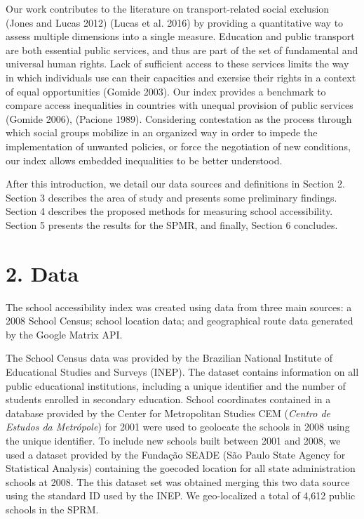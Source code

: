 \documentclass[]{article}
\begin{document}
Our work contributes to the literature on transport-related social
exclusion (Jones and Lucas 2012) (Lucas et al. 2016) by providing a
quantitative way to assess multiple dimensions into a single measure.
Education and public transport are both essential public services, and
thus are part of the set of fundamental and universal human rights. Lack
of sufficient access to these services limits the way in which
individuals use can their capacities and exersise their rights in a
context of equal opportunities (Gomide 2003). Our index provides a
benchmark to compare access inequalities in countries with unequal
provision of public services (Gomide 2006), (Pacione 1989). Considering
contestation as the process through which social groups mobilize in an
organized way in order to impede the implementation of unwanted
policies, or force the negotiation of new conditions, our index allows
embedded inequalities to be better understood.

After this introduction, we detail our data sources and definitions in
Section 2. Section 3 describes the area of study and presents some
preliminary findings. Section 4 describes the proposed methods for
measuring school accessibility. Section 5 presents the results for the
SPMR, and finally, Section 6 concludes.

\section{2. Data}\label{data}

The school accessibility index was created using data from three main
sources: a 2008 School Census; school location data; and geographical
route data generated by the Google Matrix API. 

The School Census data was provided by the
Brazilian National Institute of Educational Studies and Surveys (INEP).
The dataset contains information on all public educational
institutions, including a unique identifier and the number of students
enrolled in secondary education. School coordinates contained in a
database provided by the Center for Metropolitan Studies CEM
(\textit{Centro de Estudos da Metrópole}) for 2001 were used to
geolocate the schools in 2008 using the unique identifier.
To include new
schools built between 2001 and 2008, we used a dataset provided by the
Fundação SEADE (São Paulo State Agency for Statistical Analysis)
containing the goecoded location for all state administration schools at
2008. The this dataset set was obtained merging this two data source
using the standard ID used by the INEP. We geo-localized a total of
4,612 public schools in the SPRM.
\end{document}
